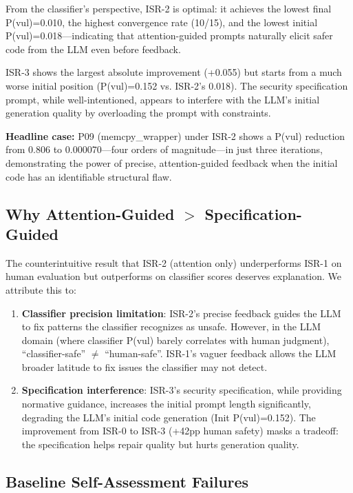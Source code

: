 \documentclass[sigconf,10pt]{acmart}
\begin{document}
From the classifier's perspective, ISR-2 is optimal: it achieves the lowest final P(vul)=0.010, the highest convergence rate (10/15), and the lowest initial P(vul)=0.018---indicating that attention-guided prompts naturally elicit safer code from the LLM even before feedback.

ISR-3 shows the largest absolute improvement (+0.055) but starts from a much worse initial position (P(vul)=0.152 vs. ISR-2's 0.018). The security specification prompt, while well-intentioned, appears to interfere with the LLM's initial generation quality by overloading the prompt with constraints.

\textbf{Headline case:} P09 (memcpy\_wrapper) under ISR-2 shows a P(vul) reduction from 0.806 to 0.000070---four orders of magnitude---in just three iterations, demonstrating the power of precise, attention-guided feedback when the initial code has an identifiable structural flaw.

\subsection{Why Attention-Guided $>$ Specification-Guided}

The counterintuitive result that ISR-2 (attention only) underperforms ISR-1 on human evaluation but outperforms on classifier scores deserves explanation. We attribute this to:

\begin{enumerate}
\item \textbf{Classifier precision limitation}: ISR-2's precise feedback guides the LLM to fix patterns the classifier recognizes as unsafe. However, in the LLM domain (where classifier P(vul) barely correlates with human judgment), ``classifier-safe'' $\neq$ ``human-safe''. ISR-1's vaguer feedback allows the LLM broader latitude to fix issues the classifier may not detect.

\item \textbf{Specification interference}: ISR-3's security specification, while providing normative guidance, increases the initial prompt length significantly, degrading the LLM's initial code generation (Init P(vul)=0.152). The improvement from ISR-0 to ISR-3 (+42pp human safety) masks a tradeoff: the specification helps repair quality but hurts generation quality.
\end{enumerate}

\subsection{Baseline Self-Assessment Failures}
\end{document}
